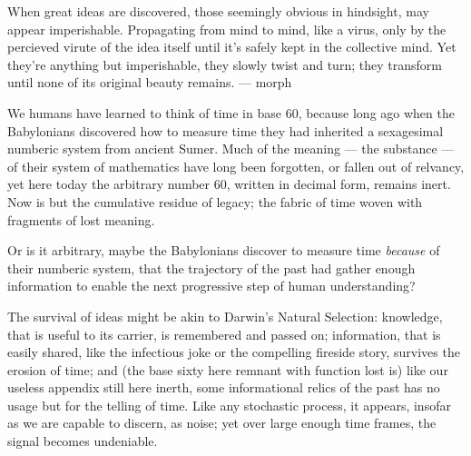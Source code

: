 

When great ideas are discovered, those seemingly obvious in hindsight, may appear imperishable. Propagating from mind to mind, like a virus, only by the percieved virute of the idea itself until it's safely kept in the collective mind. Yet they're anything but imperishable, they slowly twist and turn; they transform until none of its original beauty remains. --- morph

  We humans have learned to think of time in base 60, because long ago when the Babylonians discovered how to measure time they had inherited a sexagesimal numberic system from ancient Sumer. Much of the meaning — the substance — of their system of mathematics have long been forgotten, or fallen out of relvancy, yet here today the arbitrary number 60, written in decimal form, remains inert. Now is but the cumulative residue of legacy; the fabric of time woven with fragments of lost meaning.

Or is it arbitrary, maybe the Babylonians discover to measure time \textit{because} of their numberic system, that the trajectory of the past had gather enough information to enable the next progressive step of human understanding?


The survival of ideas might be akin to Darwin's Natural Selection: knowledge, that is useful to its carrier, is remembered and passed on; information, that is easily shared, like the infectious joke or the compelling fireside story, survives the erosion of time; and (the base sixty here remnant with function lost is) like our  useless appendix still here inerth, some informational relics of the past has no usage but for the telling of time. Like any stochastic process, it appears, insofar as we are capable to discern, as noise; yet over large enough time frames, the signal becomes undeniable.

